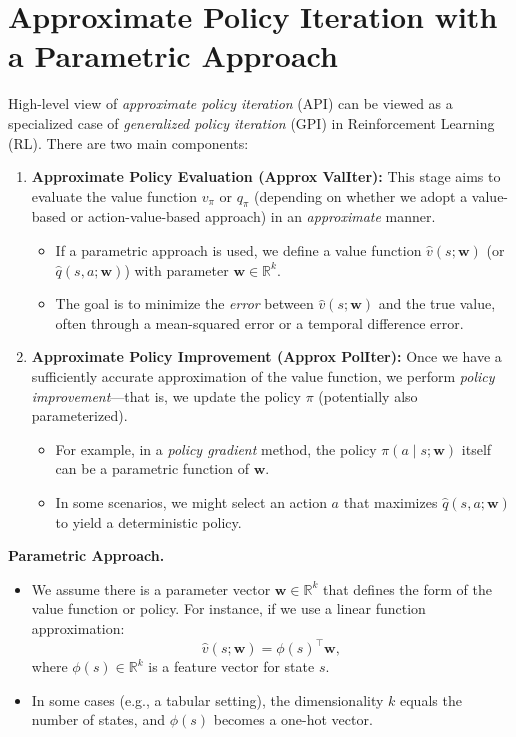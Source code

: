 \section{Approximate Policy Iteration with a Parametric Approach}

High-level view of \emph{approximate policy iteration} (API) can be viewed as a specialized 
case of \emph{generalized policy iteration} (GPI) in Reinforcement Learning (RL). 
There are two main components:

\begin{enumerate}
    \item \textbf{Approximate Policy Evaluation (Approx ValIter):}
    This stage aims to evaluate the value function $v_\pi$ or $q_\pi$ (depending 
    on whether we adopt a value-based or action-value-based approach) in an 
    \emph{approximate} manner.
    \begin{itemize}
        \item If a parametric approach is used, we define a value function 
        $\hat{v}(s; \boldsymbol{w})$ (or $\hat{q}(s,a; \boldsymbol{w})$) with parameter $\boldsymbol{w} \in \mathbb{R}^k$.
        \item The goal is to minimize the \emph{error} between $\hat{v}(s; \boldsymbol{w})$ 
        and the true value, often through a mean-squared error or a temporal difference error.
    \end{itemize}

    \item \textbf{Approximate Policy Improvement (Approx PolIter):}
    Once we have a sufficiently accurate approximation of the value function, we 
    perform \emph{policy improvement}—that is, we update the policy $\pi$ 
    (potentially also parameterized).
    \begin{itemize}
        \item For example, in a \emph{policy gradient} method, the policy 
        $\pi(a \mid s; \boldsymbol{w})$ itself can be a parametric function of $\boldsymbol{w}$.
        \item In some scenarios, we might select an action $a$ that maximizes 
        $\hat{q}(s,a; \boldsymbol{w})$ to yield a deterministic policy.
    \end{itemize}
\end{enumerate}

\noindent
\textbf{Parametric Approach.}
\begin{itemize}
    \item We assume there is a parameter vector $\boldsymbol{w} \in \mathbb{R}^k$ that defines 
    the form of the value function or policy. For instance, if we use a linear 
    function approximation:
    \[
    \hat{v}(s; \boldsymbol{w}) = \phi(s)^\top \boldsymbol{w},
    \]
    where $\phi(s) \in \mathbb{R}^k$ is a feature vector for state $s$.
    \item In some cases (e.g., a tabular setting), the dimensionality $k$ equals 
    the number of states, and $\phi(s)$ becomes a one-hot vector.
\end{itemize}


